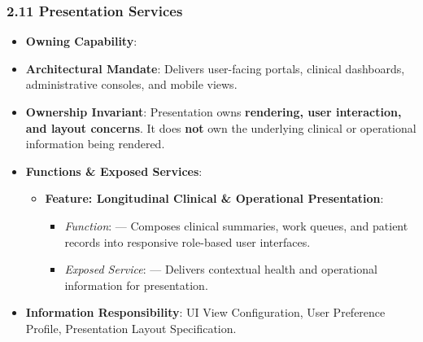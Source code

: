 \par\smallskip
{}\label{rad:ise:214}
\subsubsection*{2.11 Presentation Services}
\label{rad:ise:215}

\begin{itemize}

\item
\textbf{Owning Capability}: \texttt{}



\item
\textbf{Architectural Mandate}: Delivers user-facing portals, clinical dashboards, administrative consoles, and mobile views.



\item
\textbf{Ownership Invariant}: Presentation owns \textbf{rendering, user interaction, and layout concerns}. It does \textbf{not} own the underlying clinical or operational information being rendered.



\item
\textbf{Functions \& Exposed Services}:


\begin{itemize}

\item
\textbf{Feature: Longitudinal Clinical \& Operational Presentation}:


\begin{itemize}

\item
\emph{Function}: \texttt{} — Composes clinical summaries, work queues, and patient records into responsive role-based user interfaces.



\item
\emph{Exposed Service}: \texttt{} — Delivers contextual health and operational information for presentation.



\end{itemize}


\end{itemize}


\item
\textbf{Information Responsibility}: UI View Configuration, User Preference Profile, Presentation Layout Specification.



\end{itemize}
\label{rad:ise:224}

